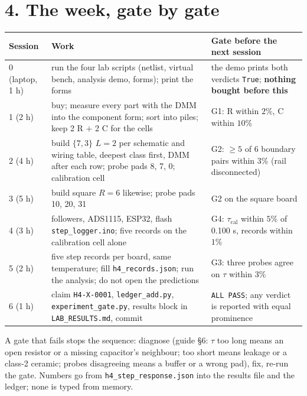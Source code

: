 \documentclass[11pt,a4paper]{article}
\begin{document}
\section*{4. The week, gate by gate}
\begin{center}\small
\begin{tabular}{lp{7.2cm}p{5.6cm}}\toprule
Session & Work & Gate before the next session \\ \midrule
0 (laptop, 1 h) & run the four lab scripts (netlist, virtual bench, analysis demo, forms); print the forms & the demo prints both verdicts \texttt{True}; \textbf{nothing bought before this} \\
1 (2 h) & buy; measure every part with the DMM into the component form; sort into piles; keep 2 R $+$ 2 C for the cells & G1: R within $2\%$, C within $10\%$ \\
2 (4 h) & build $\{7,3\}$ $L{=}2$ per schematic and wiring table, deepest class first, DMM after each row; probe pads 8, 7, 0; calibration cell & G2: $\ge5$ of 6 boundary pairs within $3\%$ (rail disconnected) \\
3 (5 h) & build square $R{=}6$ likewise; probe pads 10, 20, 31 & G2 on the square board \\
4 (3 h) & followers, ADS1115, ESP32, flash \texttt{step\_logger.ino}; five records on the calibration cell alone & G4: $\tau_{\mathrm{cal}}$ within $5\%$ of 0.100 s, records within $1\%$ \\
5 (2 h) & five step records per board, same temperature; fill \texttt{h4\_records.json}; run the analysis; do not open the predictions & G3: three probes agree on $\tau$ within $3\%$ \\
6 (1 h) & claim \texttt{H4-X-0001}, \texttt{ledger\_add.py}, \texttt{experiment\_gate.py}, results block in \texttt{LAB\_RESULTS.md}, commit & \texttt{ALL PASS}; any verdict is reported with equal prominence \\ \bottomrule
\end{tabular}
\end{center}
A gate that fails stops the sequence: diagnose (guide \S6: $\tau$ too long means an open resistor or a missing
capacitor's neighbour; too short means leakage or a class-2 ceramic; probes disagreeing means a buffer or a wrong pad),
fix, re-run the gate. Numbers go from \texttt{h4\_step\_response.json} into the results file and the ledger; none is
typed from memory.
\end{document}

